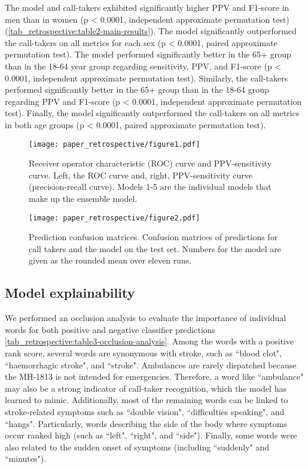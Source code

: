 {The model and call-takers exhibited significantly higher PPV and F1-score in men than in women (p < 0.0001, independent approximate permutation test) (\cref{tab_retrospective:table2-main-results}). The model significantly outperformed the call-takers on all metrics for each sex (p < 0.0001, paired approximate permutation test).
The model performed significantly better in the 65+ group than in the 18-64 year group regarding sensitivity, PPV, and F1-score (p < 0.0001, independent approximate permutation test). Similarly, the call-takers performed significantly better in the 65+ group than in the 18-64 group regarding PPV and F1-score (p < 0.0001, independent approximate permutation test). Finally, the model significantly outperformed the call-takers on all metrics in both age groups (p < 0.0001, paired approximate permutation test).

\begin{figure}[t]
    \centering
    \texttt{[image: paper\_retrospective/figure1.pdf]}
    \caption[ROC- and PPV-sensitivity curves for stroke recognition model.]{Receiver operator characteristic (ROC) curve and PPV-sensitivity curve. Left, the ROC curve and, right, PPV-sensitivity curve (precision-recall curve). Models 1-5 are the individual models that make up the ensemble model.}
    \label{fig_retrospective:figure1-roc-curve}
\end{figure}

\begin{figure}[t]
    \centering
    \texttt{[image: paper\_retrospective/figure2.pdf]}
    \caption[Prediction confusion matrices for stroke recognition.]{Prediction confusion matrices. Confusion matrices of predictions for call takers and the model on the test set. Numbers for the model are given as the rounded mean over eleven runs.}
    \label{fig_retrospective:figure2-prediction-confusion-matrices}
\end{figure}


\subsection{Model explainability}

We performed an occlusion analysis to evaluate the importance of individual words for both positive and negative classifier predictions \cref{tab_retrospective:table3-occlusion-analysis}. 
Among the words with a positive rank score, several words are synonymous with stroke, such as ``blood clot", ``haemorrhagic stroke", and ``stroke". Ambulances are rarely dispatched because the MH-1813 is not intended for emergencies. Therefore, a word like ``ambulance" may also be a strong indicator of call-taker recognition, which the model has learned to mimic. Additionally, most of the remaining words can be linked to stroke-related symptoms such as ``double vision", ``difficulties speaking", and ``hangs". Particularly, words describing the side of the body where symptoms occur ranked high (such as ``left", ``right", and ``side"). Finally, some words were also related to the sudden onset of symptoms (including ``suddenly" and ``minutes").

}
